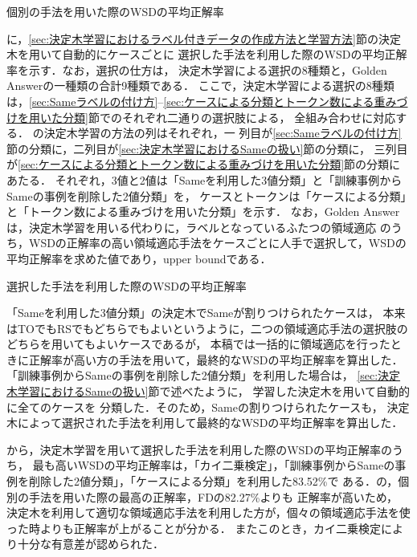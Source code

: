 \documentclass[japanese]{jnlp_1.4}
\newcommand{\tabref}[1]{}
\begin{document}
\begin{table}[b] 
\caption{個別の手法を用いた際のWSDの平均正解率} \label{tab:table2}

\end{table}

\tabref{tab:table3}に，\ref{sec:決定木学習におけるラベル付きデータの作成方法と学習方法}節の決定木を用いて自動的にケースごとに
選択した手法を利用した際のWSDの平均正解率を示す．なお，選択の仕方は，
決定木学習による選択の8種類と，Golden Answerの一種類の合計9種類である．
ここで，決定木学習による選択の8種類は，\ref{sec:Sameラベルの付け方}--\ref{sec:ケースによる分類とトークン数による重みづけを用いた分類}節でのそれぞれ二通りの選択肢による，
全組み合わせに対応する．
\tabref{tab:table3}の決定木学習の方法の列はそれぞれ，一
列目が\ref{sec:Sameラベルの付け方}節の分類に，二列目が\ref{sec:決定木学習におけるSameの扱い}節の分類に，
三列目が\ref{sec:ケースによる分類とトークン数による重みづけを用いた分類}節の分類にあたる．
それぞれ，3値と2値は「Sameを利用した3値分類」と「訓練事例からSameの事例を削除した2値分類」を，
ケースとトークンは「ケースによる分類」と「トークン数による重みづけを用いた分類」を示す．
なお，Golden Answerは，決定木学習を用いる代わりに，ラベルとなっているふたつの領域適応
のうち，WSDの正解率の高い領域適応手法をケースごとに人手で選択して，WSDの平均正解率を求めた値であり，upper boundである．

\begin{table}[t] 
\caption{選択した手法を利用した際のWSDの平均正解率} \label{tab:table3}

\end{table}

「Sameを利用した3値分類」の決定木でSameが割りつけられたケースは，
本来はTOでもRSでもどちらでもよいというように，二つの領域適応手法の選択肢のどちらを用いてもよいケースであるが，
本稿では一括的に領域適応を行ったときに正解率が高い方の手法を用いて，最終的なWSDの平均正解率を算出した．
「訓練事例からSameの事例を削除した2値分類」を利用した場合は，
\ref{sec:決定木学習におけるSameの扱い}節で述べたように，
学習した決定木を用いて自動的に全てのケースを
分類した．そのため，Sameの割りつけられたケースも，
決定木によって選択された手法を利用して最終的なWSDの平均正解率を算出した．

\tabref{tab:table3}から，決定木学習を用いて選択した手法を利用した際のWSDの平均正解率のうち，
最も高いWSDの平均正解率は，「カイ二乗検定」，「訓練事例からSameの事例を削除した2値分類」，「ケースによる分類」を利用した83.52\%で
ある．\tabref{tab:table2}の，個別の手法を用いた際の最高の正解率，FDの82.27\%よりも
正解率が高いため，
決定木を利用して適切な領域適応手法を利用した方が，個々の領域適応手法を使った時よりも正解率が上がることが分かる．
またこのとき，カイ二乗検定により十分な有意差が認められた．
\end{document}
